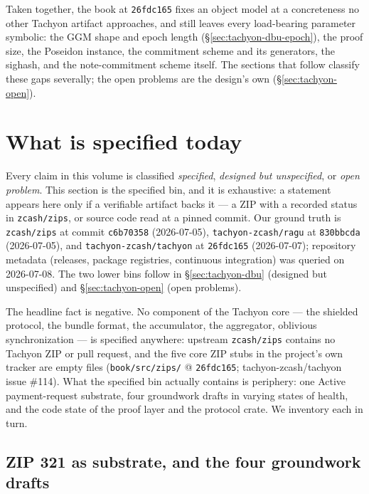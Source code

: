 \documentclass[11pt,a4paper]{article}
\theoremstyle{definition}
\begin{document}
\medskip
\noindent
Taken together, the book at \texttt{26fdc165} fixes an object model at a
concreteness no other Tachyon artifact approaches, and still leaves every
load-bearing parameter symbolic: the GGM shape and epoch length
(\S\ref{sec:tachyon-dbu-epoch}), the proof size, the Poseidon instance,
the commitment scheme and its generators, the sighash, and the
note-commitment scheme itself. The sections that follow classify these
gaps severally; the open problems are the design's own
(\S\ref{sec:tachyon-open}).

\section{What is specified today}\label{sec:tachyon-specified}

Every claim in this volume is classified \emph{specified}, \emph{designed
but unspecified}, or \emph{open problem}. This section is the
specified bin, and it is exhaustive: a statement appears here only if a
verifiable artifact backs it --- a ZIP with a recorded status in
\texttt{zcash/zips}, or source code read at a pinned commit. Our ground truth
is \texttt{zcash/zips} at commit \texttt{c6b70358} (2026-07-05),
\texttt{tachyon-zcash/ragu} at \texttt{830bbcda} (2026-07-05), and
\texttt{tachyon-zcash/tachyon} at \texttt{26fdc165} (2026-07-07); repository
metadata (releases, package registries, continuous integration) was queried
on 2026-07-08. The two lower bins follow in \S\ref{sec:tachyon-dbu}
(designed but unspecified) and \S\ref{sec:tachyon-open} (open problems).

The headline fact is negative. No component of the Tachyon core --- the
shielded protocol, the bundle format, the accumulator, the aggregator,
oblivious synchronization --- is specified anywhere: upstream
\texttt{zcash/zips} contains no Tachyon ZIP or pull request, and the five
core ZIP stubs in the project's own tracker are empty files
(\texttt{book/src/zips/} @ \texttt{26fdc165}; tachyon-zcash/tachyon
issue \#114). What the specified bin actually contains is periphery: one
Active payment-request substrate, four groundwork drafts in varying states
of health, and the code state of the proof layer and the protocol crate. We
inventory each in turn.

\subsection{ZIP 321 as substrate, and the four groundwork drafts}
\label{sec:tachyon-groundwork}
\end{document}
